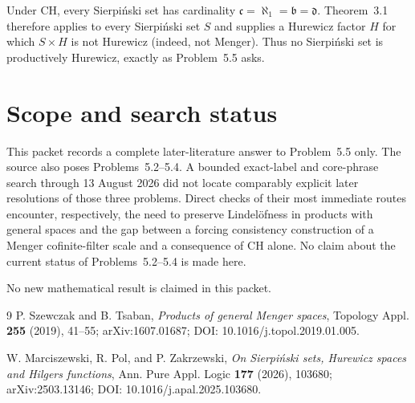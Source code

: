 \documentclass[11pt]{article}
\begin{document}
Under CH, every Sierpi\'nski set has cardinality
$\mathfrak c=\aleph_1=\mathfrak b=\mathfrak d$.  Theorem~3.1 therefore
applies to every Sierpi\'nski set $S$ and supplies a Hurewicz factor $H$
for which $S\times H$ is not Hurewicz (indeed, not Menger).  Thus no
Sierpi\'nski set is productively Hurewicz, exactly as Problem~5.5 asks.

\section{Scope and search status}

This packet records a complete later-literature answer to Problem~5.5
only.  The source also poses Problems~5.2--5.4.  A bounded exact-label and
core-phrase search through 13 August 2026 did not locate comparably
explicit later resolutions of those three problems.  Direct checks of
their most immediate routes encounter, respectively, the need to preserve
Lindel\"ofness in products with general spaces and the gap between a
forcing consistency construction of a Menger cofinite-filter scale and a
consequence of CH alone.  No claim about the current status of
Problems~5.2--5.4 is made here.

No new mathematical result is claimed in this packet.

\begin{thebibliography}{9}
P. Szewczak and B. Tsaban,
\emph{Products of general Menger spaces},
Topology Appl. \textbf{255} (2019), 41--55;
arXiv:1607.01687; DOI: 10.1016/j.topol.2019.01.005.

W. Marciszewski, R. Pol, and P. Zakrzewski,
\emph{On Sierpi\'nski sets, Hurewicz spaces and Hilgers functions},
Ann. Pure Appl. Logic \textbf{177} (2026), 103680;
arXiv:2503.13146; DOI: 10.1016/j.apal.2025.103680.
\end{thebibliography}
\end{document}
